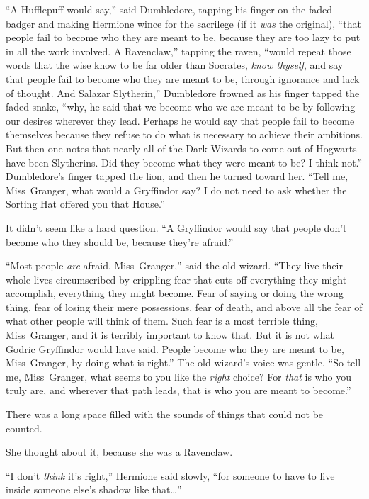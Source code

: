 “A Hufflepuff would say,” said Dumbledore, tapping his finger on the faded badger and making Hermione wince for the sacrilege (if it \emph{was} the original), “that people fail to become who they are meant to be, because they are too lazy to put in all the work involved. A Ravenclaw,” tapping the raven, “would repeat those words that the wise know to be far older than Socrates, \emph{know thyself}, and say that people fail to become who they are meant to be, through ignorance and lack of thought. And Salazar Slytherin,” Dumbledore frowned as his finger tapped the faded snake, “why, he said that we become who we are meant to be by following our desires wherever they lead. Perhaps he would say that people fail to become themselves because they refuse to do what is necessary to achieve their ambitions. But then one notes that nearly all of the Dark Wizards to come out of Hogwarts have been Slytherins. Did they become what they were meant to be? I think not.” Dumbledore’s finger tapped the lion, and then he turned toward her.
“Tell me, Miss~Granger, what would a Gryffindor say? I do not need to ask whether the Sorting Hat offered you that House.”

It didn’t seem like a hard question.
“A Gryffindor would say that people don’t become who they should be, because they’re afraid.”

“Most people \emph{are} afraid, Miss~Granger,” said the old wizard.
“They live their whole lives circumscribed by crippling fear that cuts off everything they might accomplish, everything they might become. Fear of saying or doing the wrong thing, fear of losing their mere possessions, fear of death, and above all the fear of what other people will think of them. Such fear is a most terrible thing, Miss~Granger, and it is terribly important to know that. But it is not what Godric Gryffindor would have said. People become who they are meant to be, Miss~Granger, by doing what is right.” The old wizard’s voice was gentle.
“So tell me, Miss~Granger, what seems to you like the \emph{right} choice? For \emph{that} is who you truly are, and wherever that path leads, that is who you are meant to become.”

There was a long space filled with the sounds of things that could not be counted.

She thought about it, because she was a Ravenclaw.

“I don’t \emph{think} it’s right,” Hermione said slowly, “for someone to have to live inside someone else’s shadow like that…”

